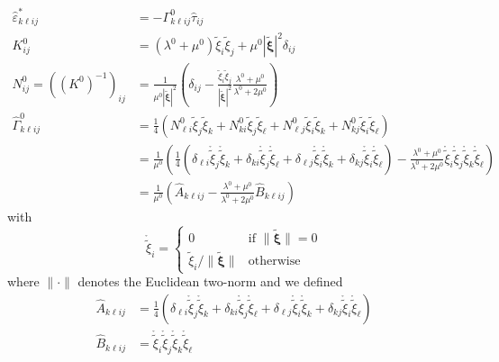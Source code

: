 \documentclass[11pt]{article}
\renewcommand{\vec}[1]{\boldsymbol{#1}}
\begin{document}
\begin{equation}
    \begin{aligned}
\widehat{\varepsilon}^*_{k\ell ij} &= -\Gamma^0_{k\ell ij} \widehat{\tau}_{ij}\\
K^0_{ij} &= (\lambda^0+\mu^0)\widetilde{\xi}_i\widetilde{\xi}_j + \mu^0 |\widetilde{\vec{\xi}}|^2 \delta_{ij}\\
N^0_{ij} =\left((K^0)^{-1}\right)_{ij} &= \frac{1}{\mu^0 |\widetilde{\vec{\xi}}|^2}\left(\delta_{ij}-\frac{\widetilde{\xi}_i\widetilde{\xi}_j}{|\widetilde{\vec{\xi}}|^2}\frac{\lambda^0+\mu^0}{\lambda^0+2\mu^0}\right)\\
\widehat{\Gamma}^0_{k\ell ij} &= \frac{1}{4}\left(N^0_{\ell i}\widetilde{\xi}_j\widetilde{\xi}_k+N^0_{k i}\widetilde{\xi}_j\widetilde{\xi}_\ell + N^0_{\ell j}\widetilde{\xi}_i\widetilde{\xi}_k+N^0_{kj}\widetilde{\xi}_i\widetilde{\xi}_\ell\right)\\
&= \frac{1}{\mu^0}\left(\frac{1}{4}\left(\delta_{\ell i} \mathring{\widetilde{\xi}}_j\mathring{\widetilde{\xi}}_k+\delta_{ki} \mathring{\widetilde{\xi}}_j\mathring{\widetilde{\xi}}_\ell+\delta_{\ell j} \mathring{\widetilde{\xi}}_i\mathring{\widetilde{\xi}}_k+\delta_{k j} \mathring{\widetilde{\xi}}_i\mathring{\widetilde{\xi}}_\ell\right)-\frac{\lambda^0+\mu^0}{\lambda^0+2\mu^0}\mathring{\widetilde{\xi}}_i\mathring{\widetilde{\xi}}_j\mathring{\widetilde{\xi}}_k\mathring{\widetilde{\xi}}_\ell\right)\\
&= \frac{1}{\mu^0}\left( \widehat{A}_{k\ell ij} - \frac{\lambda^0+\mu^0}{\lambda^0+2\mu^0} \widehat{B}_{k\ell ij}\right)
    \end{aligned}\label{eqn:fourier_expression}
\end{equation}
with
\begin{equation}
\mathring{\widetilde{\xi}}_i = \begin{cases}
0 & \text{if $\|\widetilde{\vec{\xi}}\|=0$}\\
\widetilde{\xi}_i/\|\widetilde{\vec{\xi}}\| & \text{otherwise}
\end{cases}
\end{equation}
where $\|\cdot\|$ denotes the Euclidean two-norm and we defined
\begin{equation}
\begin{aligned}
\widehat{A}_{k\ell ij} &= \frac{1}{4}\left(\delta_{\ell i} \mathring{\widetilde{\xi}}_j\mathring{\widetilde{\xi}}_k+\delta_{ki} \mathring{\widetilde{\xi}}_j\mathring{\widetilde{\xi}}_\ell+\delta_{\ell j} \mathring{\widetilde{\xi}}_i\mathring{\widetilde{\xi}}_k+\delta_{k j} \mathring{\widetilde{\xi}}_i\mathring{\widetilde{\xi}}_\ell\right)\\
\widehat{B}_{k\ell ij} &= \mathring{\widetilde{\xi}}_i\mathring{\widetilde{\xi}}_j\mathring{\widetilde{\xi}}_k\mathring{\widetilde{\xi}}_\ell
\end{aligned}
\end{equation}
\end{document}
